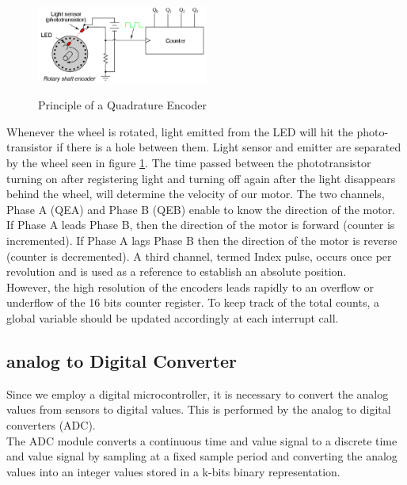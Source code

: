 \begin{figure}[H]
    \caption{Principle of a Quadrature Encoder \cite{alex}}
    \centering
    \includegraphics[width=0.5\textwidth]{figures/software/qei_demo.png}
    \label{fig:qei_demo}
\end{figure}
\vskip 0.2in
\noindent
Whenever the wheel is rotated, light emitted from the LED will hit the photo-transistor if there is a hole between them. Light sensor and emitter are separated by the wheel seen in figure \ref{fig:qei_demo}. The time passed between the phototransistor turning on after registering light and turning off again after the light disappears behind the wheel, will determine the velocity of our motor.
\vskip 0.2in
\noindent
The two channels, Phase A (QEA) and Phase B (QEB) enable to know the direction of the motor. If Phase A leads Phase B, then the direction of the motor is forward (counter is incremented). If Phase A lags Phase B then the direction of the motor is reverse (counter is decremented). A third channel, termed Index pulse, occurs once per revolution and is used as a reference to establish an absolute position.\\
However, the high resolution of the encoders leads rapidly to an overflow or underflow of the 16 bits counter register. To keep track of the total counts, a global variable should be updated accordingly at each interrupt call.

\subsection{analog to Digital Converter}

Since we employ a digital microcontroller, it is necessary to convert the analog values from sensors to digital values. This is performed by the analog to digital converters (ADC).\\
The ADC module converts a continuous time and value signal to a discrete time and value signal by sampling at a fixed sample period and converting the analog values into an integer values stored in a k-bits binary representation.

